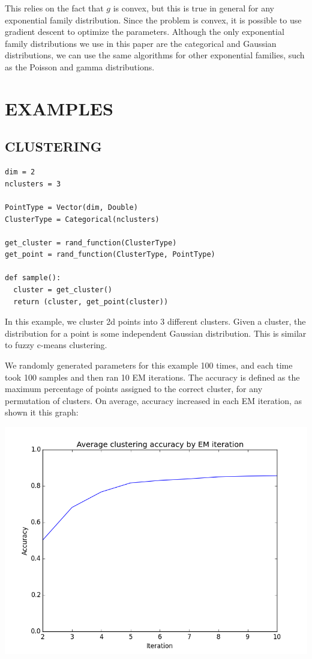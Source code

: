 \documentclass{article}
\begin{document}
    This relies on the fact that $g$ is convex, but this is true in general for any exponential family distribution.
    Since the problem is convex, it is possible to use gradient descent to optimize the parameters.  Although
    the only exponential family distributions we use in this paper are the categorical and Gaussian distributions,
    we can use the same algorithms for other exponential families, such as the Poisson and gamma distributions.



  \section{EXAMPLES}

  \subsection{CLUSTERING}
{\small
\begin{verbatim}
dim = 2
nclusters = 3

PointType = Vector(dim, Double)
ClusterType = Categorical(nclusters)

get_cluster = rand_function(ClusterType)
get_point = rand_function(ClusterType, PointType)

def sample():
  cluster = get_cluster()
  return (cluster, get_point(cluster))
\end{verbatim}
}

In this example, we cluster 2d points into 3 different clusters.  Given a cluster, the distribution for a point is some independent Gaussian distribution.  This is similar to fuzzy c-means clustering.

We randomly generated parameters for this example 100 times, and each time took 100 samples and then ran 10 EM iterations.  The accuracy is defined as the maximum percentage of points assigned to the correct cluster, for any permutation of clusters.  On average, accuracy increased in each EM iteration, as shown it this graph:

\begin{center}
\includegraphics[scale=0.4]{cluster_accuracy.png}
\end{center}
\end{document}
